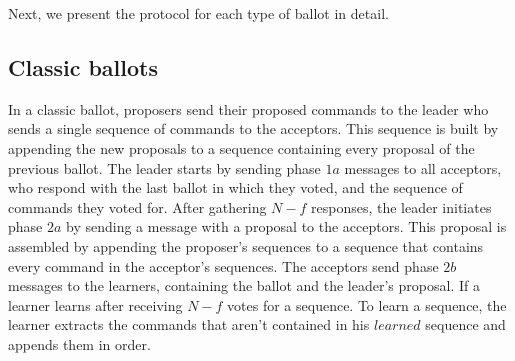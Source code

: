 Next, we present the protocol for each type of ballot in detail.

\subsection{Classic ballots} 

In a classic ballot, proposers send their proposed commands to the leader who sends a single sequence of commands to the acceptors. This sequence is built by appending the new proposals to a sequence containing every proposal of the previous ballot. The leader starts by sending phase $1a$ messages to all acceptors, who respond with the last ballot in which they voted, and the sequence of commands they voted for. After gathering $N-f$ responses, the leader initiates phase $2a$ by sending a message with a proposal to the acceptors. This proposal is assembled by appending the proposer's sequences to a sequence that contains every command in the acceptor's sequences. The acceptors send phase $2b$ messages to the learners, containing the ballot and the leader's proposal. If a learner learns after receiving $N-f$ votes for a sequence. To learn a sequence, the learner extracts the commands that aren't contained in his $learned$ sequence and appends them in order.





